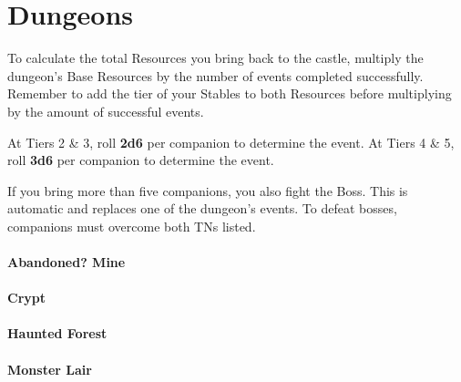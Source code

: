 \chapter{Dungeons}

\thispagestyle{empty}

To calculate the total Resources you bring back to the castle, multiply the dungeon’s Base Resources by the number of events completed successfully. Remember to add the tier of your Stables to both Resources before multiplying by the amount of successful events.

\skipline

At Tiers 2 \& 3, roll \textbf{2d6} per companion to determine the event. At Tiers 4 \& 5, roll \textbf{3d6} per companion to determine the event.

\skipline

If you bring more than five companions, you also fight the Boss. This is automatic and replaces one of the dungeon’s events. To defeat bosses, companions must overcome both TNs listed.

\begin{multicols}{2}

	\subsubsection{Abandoned? Mine}
	
	\subsubsection{Crypt}
	
	\columnbreak
	
	\subsubsection{Haunted Forest}
	
	\subsubsection{Monster Lair}
	
\end{multicols}
	

